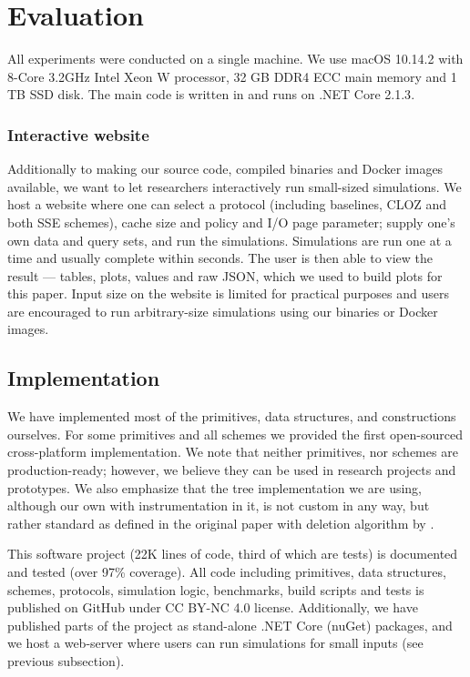 \section{Evaluation}\label{section:range-snapshot:evaluation}

	All experiments were conducted on a single machine.
	We use macOS 10.14.2 with 8-Core 3.2GHz Intel Xeon W processor, 32 GB DDR4 ECC main memory and 1 TB SSD disk.
	The main code is written in {\Csharp} and runs on {.NET Core 2.1.3}.

	\subsubsection*{Interactive website}\label{section:range-snapshot:website}

		Additionally to making our source code, compiled binaries and Docker images available, we want to let researchers interactively run small-sized simulations.
		We host a website \cite{ore-website} where one can select a protocol (including baselines, CLOZ and both SSE schemes), cache size and policy and I/O page parameter; supply one's own data and query sets, and run the simulations.
		Simulations are run one at a time and usually complete within seconds.
		The user is then able to view the result --- tables, plots, values and raw JSON, which we used to build plots for this paper.
		Input size on the website is limited for practical purposes and users are encouraged to run arbitrary-size simulations using our binaries or Docker images.

	\subsection{Implementation}

		We have implemented most of the primitives, data structures, and constructions ourselves.
		For some primitives and all schemes we provided the first open-sourced cross-platform {\Csharp} implementation.
		We note that neither primitives, nor schemes are production-ready; however, we believe they can be used in research projects and prototypes.
		We also emphasize that the {\BPlus} tree implementation we are using, although our own with instrumentation in it, is not custom in any way, but rather standard as defined in the original paper \cite{b-tree} with deletion algorithm by \cite{b-plus-tree-deletion}.

		This software project (22K lines of code, third of which are tests) is documented and tested (over 97\% coverage).
		All code including primitives, data structures, schemes, protocols, simulation logic, benchmarks, build scripts and tests is published on GitHub \cite{ore-project} under CC BY-NC 4.0 license.
		Additionally, we have published parts of the project as stand-alone {.NET Core} (nuGet) packages, and we host a web-server where users can run simulations for small inputs (see previous subsection).

